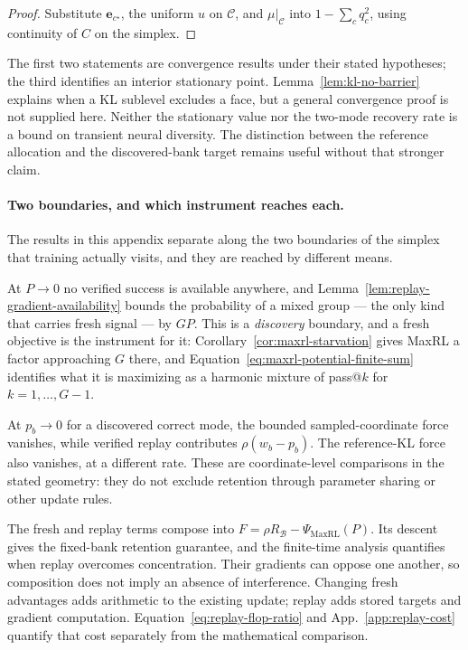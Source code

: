 \documentclass{article}
\newcommand{\1}{\mathbf 1}
\theoremstyle{remark}
\theoremstyle{definition}
\theoremstyle{plain}
\begin{document}
\begin{proof}
Substitute $\mathbf e_{c^\star}$, the uniform $u$ on $\mathcal C$, and
$\mu|_{\mathcal C}$ into $1-\sum_cq_c^2$, using continuity of $C$ on the
simplex.
\end{proof}

The first two statements are convergence results under their stated
hypotheses; the third identifies an interior stationary point.
Lemma~\ref{lem:kl-no-barrier} explains when a KL sublevel excludes a face,
but a general convergence proof is not supplied here.
Neither the stationary value nor the two-mode recovery rate is a bound on
transient neural diversity. The distinction between the reference allocation
and the discovered-bank target remains useful without that stronger claim.

\paragraph{Two boundaries, and which instrument reaches each.}
The results in this appendix separate along the two boundaries of the simplex
that training actually visits, and they are reached by different means.

At $P\to0$ no verified success is available anywhere, and
Lemma~\ref{lem:replay-gradient-availability} bounds the probability of a
mixed group --- the only kind that carries fresh signal --- by $GP$. This is a
\emph{discovery} boundary, and a fresh objective is the instrument for it:
Corollary~\ref{cor:maxrl-starvation} gives MaxRL a factor approaching $G$
there, and Equation~\eqref{eq:maxrl-potential-finite-sum} identifies what it
is maximizing as a harmonic mixture of pass@$k$ for $k=1,\ldots,G-1$.

At $p_b\to0$ for a discovered correct mode, the bounded sampled-coordinate
force vanishes, while verified replay contributes $\rho(w_b-p_b)$.
The reference-KL force also vanishes, at a different rate.
These are coordinate-level comparisons in the stated geometry: they do not
exclude retention through parameter sharing or other update rules.

The fresh and replay terms compose into
$F=\rho R_{\mathcal B}-\Psi_{\mathrm{MaxRL}}(P)$.
Its descent gives the fixed-bank retention guarantee, and the finite-time
analysis quantifies when replay overcomes concentration. Their gradients can
oppose one another, so composition does not imply an absence of interference.
Changing fresh advantages adds arithmetic to the existing update; replay adds
stored targets and gradient computation. Equation~\eqref{eq:replay-flop-ratio}
and App.~\ref{app:replay-cost} quantify that cost separately from the
mathematical comparison.
\end{document}
